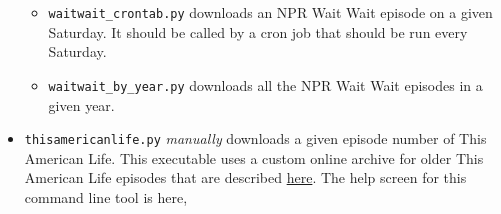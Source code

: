 \documentclass[]{article}
\begin{document}
\begin{itemize}
\begin{itemize}
   \item {\verb|waitwait_crontab.py|} downloads an NPR Wait Wait episode on a given Saturday. It should be called by a cron job that should be run every Saturday.
   
   \item {\verb|waitwait_by_year.py|} downloads all the NPR Wait Wait episodes in a given year.
  \end{itemize}

  \item {\verb|thisamericanlife.py|} \textit{manually} downloads a given episode number of This American Life. This executable uses a custom online archive for older This American Life episodes that are described \href{http://www.dirtygreek.org/t/download-this-american-life-episodes}{here}. The help screen for this command line tool is here,
  
\end{itemize}
\end{document}
